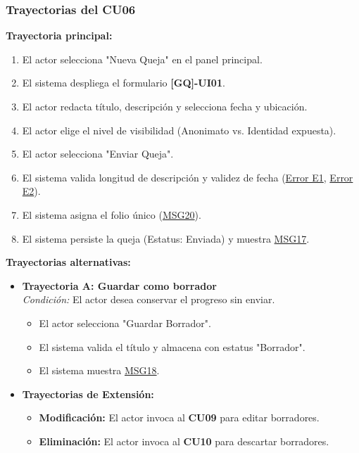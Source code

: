 \begin{appendices}
\subsubsection{Trayectorias del CU06}
\textbf{Trayectoria principal:}
\begin{enumerate}[nosep]
    \item El actor selecciona "Nueva Queja" en el panel principal.
    \item El sistema despliega el formulario \textbf{[GQ]-UI01}.
    \item El actor redacta título, descripción y selecciona fecha y ubicación.
    \item El actor elige el nivel de visibilidad (Anonimato vs. Identidad expuesta).
    \item El actor selecciona "Enviar Queja".
    \item El sistema valida longitud de descripción y validez de fecha (\hyperlink{err:E10}{Error E1}, \hyperlink{err:E11}{Error E2}).
    \item El sistema asigna el folio único (\hyperlink{msg:MSG20}{MSG20}).
    \item El sistema persiste la queja (Estatus: Enviada) y muestra \hyperlink{msg:MSG17}{MSG17}.
\end{enumerate}

\textbf{Trayectorias alternativas:}
\begin{itemize}[leftmargin=*]
    \item \textbf{Trayectoria A: Guardar como borrador} \\
    \textit{Condición:} El actor desea conservar el progreso sin enviar.
    \begin{itemize}[nosep]
        \item[A-1:] El actor selecciona "Guardar Borrador".
        \item[A-2:] El sistema valida el título y almacena con estatus "Borrador".
        \item[A-3:] El sistema muestra \hyperlink{msg:MSG18}{MSG18}.
    \end{itemize}
    \item \textbf{Trayectorias de Extensión:}
    \begin{itemize}[nosep]
        \item \textbf{Modificación:} El actor invoca al \textbf{CU09} para editar borradores.
        \item \textbf{Eliminación:} El actor invoca al \textbf{CU10} para descartar borradores.
    \end{itemize}
\end{itemize}


\end{appendices}
